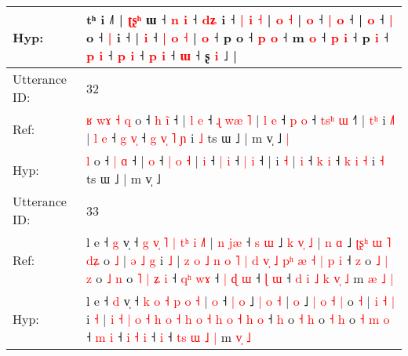 \documentclass[10pt]{article}
\DeclareRobustCommand{\hl}[1]{{\textcolor{red}{#1}}}
\begin{document}
\begin{longtable}{ll}
 \\
Hyp: & tʰ i ˩˥ |\hl{}\hl{}\hl{}\hl{} \hl{ʈ}\hl{ʂ}\hl{ʰ} ɯ ˧ \hl{n} \hl{i} ˧ \hl{}\hl{d}\hl{ʑ} i ˧ \hl{|} \hl{i} \hl{˧} |\hl{}\hl{}\hl{} \hl{o} \hl{}\hl{˧} |\hl{}\hl{} \hl{o} ˧ \hl{|} \hl{o} ˧\hl{} |\hl{}\hl{} \hl{}\hl{o} ˧ \hl{|} o ˧ \hl{|} i\hl{} ˧ |\hl{}\hl{} \hl{i} ˧ \hl{|} \hl{}\hl{o} \hl{˧} |\hl{}\hl{} \hl{o} ˧ p o ˧ \hl{}\hl{}\hl{p} \hl{o} ˧\hl{}\hl{}\hl{}\hl{}\hl{}\hl{}\hl{}\hl{}\hl{}\hl{}\hl{}\hl{}\hl{}\hl{}\hl{} m\hl{}\hl{}\hl{}\hl{}\hl{}\hl{}\hl{}\hl{}\hl{} \hl{o} ˧\hl{}\hl{}\hl{}\hl{}\hl{}\hl{}\hl{}\hl{}\hl{} \hl{p} \hl{i} ˧ p \hl{i} ˧ \hl{}\hl{}\hl{p} \hl{i} ˧\hl{}\hl{}\hl{} \hl{p} \hl{i} ˧ \hl{p} \hl{i} ˧\hl{}\hl{}\hl{}\hl{} \hl{ɯ} ˧\hl{}\hl{}\hl{}\hl{}\hl{}\hl{} ʂ \hl{i} ˩ |
 \\
\midrule
Utterance ID: & 32 \\
Ref: & \hl{ʁ}\hl{ }\hl{w}\hl{ɤ}\hl{ }\hl{˧}\hl{ }\hl{q} o ˧ \hl{h} \hl{i}\hl{̃} ˧ |\hl{ }\hl{l} \hl{e} ˧ \hl{ɻ} \hl{w}\hl{æ} \hl{˥} |\hl{ }\hl{l} \hl{e} ˧ \hl{p} \hl{o} ˧ \hl{t}\hl{s}\hl{ʰ} \hl{ɯ} ˧\hl{˥} |\hl{ }\hl{t}\hl{ʰ} i \hl{˩}\hl{˥} |\hl{ }\hl{l} \hl{e} ˧ \hl{g} \hl{v}\hl{̩} ˧\hl{ }\hl{g} \hl{v}\hl{̩} \hl{˥} \hl{ɲ} i \hl{˩} ts ɯ ˩ | m v̩ ˩\hl{ }\hl{|}
 \\
Hyp: & \hl{}\hl{}\hl{}\hl{}\hl{}\hl{}\hl{}\hl{l} o ˧ \hl{|} \hl{}\hl{ɑ} ˧ |\hl{}\hl{} \hl{o} ˧ \hl{|} \hl{}\hl{o} \hl{˧} |\hl{}\hl{} \hl{i} ˧ \hl{|} \hl{i} ˧ \hl{}\hl{}\hl{|} \hl{i} ˧\hl{} |\hl{}\hl{}\hl{} i \hl{}\hl{˧} |\hl{}\hl{} \hl{i} ˧ \hl{k} \hl{}\hl{i} ˧\hl{}\hl{} \hl{}\hl{k} \hl{i} \hl{˧} i \hl{˧} ts ɯ ˩ | m v̩ ˩\hl{}\hl{}
 \\
\midrule
Utterance ID: & 33 \\
Ref: & l e ˧ \hl{g} v̩ ˧\hl{ }\hl{g} \hl{v}\hl{̩} \hl{˥} \hl{|} \hl{t}\hl{ʰ} \hl{i} \hl{˩}\hl{˥} |\hl{ }\hl{n} \hl{j}\hl{æ} ˧ \hl{s} \hl{ɯ} ˩ \hl{k} \hl{v}\hl{̩} \hl{˩} |\hl{ }\hl{n} \hl{ɑ} ˩ \hl{ʈ}\hl{ʂ}\hl{ʰ} \hl{ɯ} \hl{˥} \hl{d}\hl{ʑ} o \hl{˩} | \hl{ə} \hl{˩} \hl{g} i \hl{˩} | \hl{z} \hl{o} \hl{˩} \hl{n} \hl{o} \hl{˥} \hl{|} \hl{d} \hl{v}\hl{̩} \hl{˩} \hl{p}\hl{ʰ} \hl{æ} \hl{˧} \hl{|} \hl{p} \hl{i} ˧ \hl{z} o\hl{ }\hl{˩} \hl{|} \hl{z} o \hl{˩} \hl{n} o\hl{ }\hl{˥} \hl{|} \hl{ʑ} \hl{i} ˧ \hl{q}\hl{ʰ} \hl{w}\hl{ɤ} ˧ \hl{|} \hl{ɖ} \hl{ɯ} ˧\hl{ }\hl{ɭ} \hl{ɯ} ˧\hl{ }\hl{d} \hl{i}\hl{ }\hl{˩} \hl{k} \hl{v}\hl{̩} \hl{˩} m \hl{æ}\hl{ }\hl{˩} \hl{|}
 \\
Hyp: & l e ˧ \hl{d} v̩ ˧\hl{}\hl{} \hl{}\hl{k} \hl{o} \hl{˧} \hl{}\hl{p} \hl{o} \hl{}\hl{˧} |\hl{}\hl{} \hl{}\hl{o} ˧ \hl{|} \hl{o} ˩ \hl{|} \hl{}\hl{o} \hl{˧} |\hl{}\hl{} \hl{o} ˩ \hl{}\hl{}\hl{|} \hl{o} \hl{˧} \hl{}\hl{|} o \hl{˧} | \hl{i} \hl{˧} \hl{|} i \hl{˧} | \hl{i} \hl{˧} \hl{|} \hl{o} \hl{˧} \hl{h} \hl{o} \hl{˧} \hl{}\hl{h} \hl{o} \hl{}\hl{˧} \hl{h} \hl{o} \hl{˧} \hl{h} \hl{o} ˧ \hl{h} o\hl{}\hl{} \hl{˧} \hl{h} o \hl{˧} \hl{h} o\hl{}\hl{} \hl{˧} \hl{m} \hl{o} ˧ \hl{}\hl{m} \hl{}\hl{i} ˧ \hl{i} \hl{˧} \hl{i} ˧\hl{}\hl{} \hl{i} ˧\hl{}\hl{} \hl{}\hl{t}\hl{s} \hl{ɯ} \hl{}\hl{˩} \hl{|} m \hl{}\hl{v}\hl{̩} \hl{˩}

\end{longtable}
\end{document}
